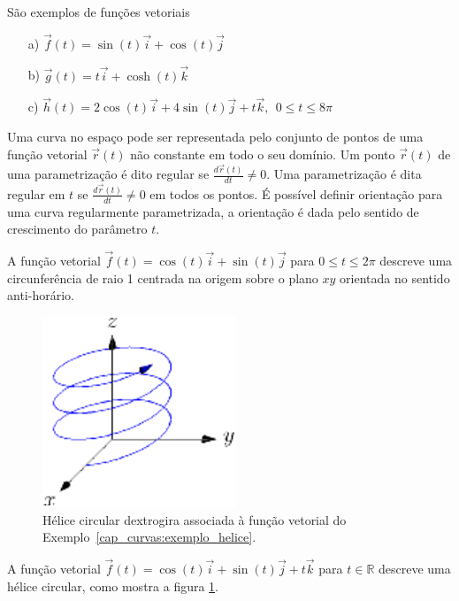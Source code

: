\begin{ex}\label{exfv01} São exemplos de funções vetoriais
\begin{itemize}
\item [a)] $\vec{f}(t)=\sin(t)\vec{i}+\cos(t)\vec{j}$
\item [b)] $\vec{g}(t)=t \vec{i}+\cosh(t)\vec{k}$
\item [c)] $\vec{h}(t)=2\cos(t)\vec{i}+4\sin(t)\vec{j}+t\vec{k},~~ 0\leq t \leq 8\pi$
\end{itemize}
\end{ex}

Uma curva no espaço pode ser representada pelo conjunto de pontos de uma função vetorial $\vec{r}(t)$ não constante em todo o seu domínio. Um ponto $\vec{r}(t)$ de uma parametrização é dito regular se $\frac{d\vec{r}(t)}{dt} \neq 0$. Uma parametrização é dita regular em $t$ se $\frac{d\vec{r}(t)}{dt} \neq 0$ em todos os pontos. É possível definir orientação para uma curva regularmente parametrizada, a orientação é dada pelo sentido de crescimento do parâmetro $t$.

\begin{ex}
A função vetorial $\vec{f}(t)=\cos(t)\vec{i}+\sin(t)\vec{j}$ para $0\leq t \leq 2\pi$ descreve  uma circunferência de raio 1 centrada na origem sobre o plano $xy$ orientada no sentido anti-horário.
\end{ex}

\begin{figure}%
\begin{center}
    \includegraphics{./cap_curvas/figs/helice}
\caption{\label{helicedex}Hélice circular dextrogira associada à função vetorial do Exemplo~\ref{cap_curvas:exemplo_helice}.}
  \end{center}
\end{figure}

\begin{ex}\label{cap_curvas:exemplo_helice}
A função vetorial $\vec{f}(t)=\cos(t)\vec{i}+\sin(t)\vec{j}+t\vec{k}$ para $ t \in\mathbb{R}$ descreve uma hélice circular, como mostra a figura \ref{helicedex}.
\end{ex}

